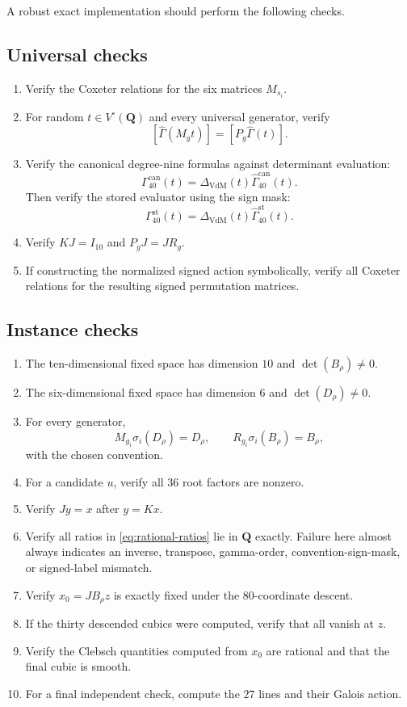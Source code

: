 \documentclass[11pt]{article}
\newcommand{\QQ}{\mathbf{Q}}
\newcommand{\Gamhat}{\widehat{\Gamma}}
\newcommand{\Deltav}{\Delta_{\mathrm{VdM}}}
\begin{document}
A robust exact implementation should perform the following checks.

\subsection{Universal checks}

\begin{enumerate}
\item Verify the Coxeter relations for the six matrices $M_{s_i}$.
\item For random $t\in V^\circ(\QQ)$ and every universal generator, verify
\[
  [\Gamhat(M_gt)]=[P_g\Gamhat(t)].
\]
\item Verify the canonical degree-nine formulas against determinant evaluation:
\[
  \Gamma^{\mathrm{can}}_{40}(t)
  =\Deltav(t)\Gamhat^{\mathrm{can}}_{40}(t).
\]
Then verify the stored evaluator using the sign mask:
\[
  \Gamma^{\mathrm{st}}_{40}(t)
  =\Deltav(t)\Gamhat^{\mathrm{st}}_{40}(t).
\]
\item Verify $KJ=I_{10}$ and $P_gJ=JR_g$.
\item If constructing the normalized signed action symbolically, verify all Coxeter
relations for the resulting signed permutation matrices.
\end{enumerate}

\subsection{Instance checks}

\begin{enumerate}
\item The ten-dimensional fixed space has dimension $10$ and
$\det(B_\rho)\neq0$.
\item The six-dimensional fixed space has dimension $6$ and
$\det(D_\rho)\neq0$.
\item For every generator,
\[
  M_{g_i}\sigma_i(D_\rho)=D_\rho,
  \qquad
  R_{g_i}\sigma_i(B_\rho)=B_\rho,
\]
with the chosen convention.
\item For a candidate $u$, verify all $36$ root factors are nonzero.
\item Verify $Jy=x$ after $y=Kx$.
\item Verify all ratios in \eqref{eq:rational-ratios} lie in $\QQ$ exactly.  Failure
here almost always indicates an inverse, transpose, gamma-order, convention-sign-mask, or signed-label
mismatch.
\item Verify $x_0=JB_\rho z$ is exactly fixed under the $80$-coordinate descent.
\item If the thirty descended cubics were computed, verify that all vanish at $z$.
\item Verify the Clebsch quantities computed from $x_0$ are rational and that the
final cubic is smooth.
\item For a final independent check, compute the $27$ lines and their Galois action.
\end{enumerate}
\end{document}
